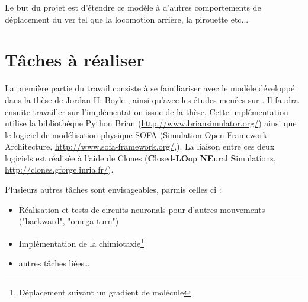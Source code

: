 Le but du projet est d'étendre ce modèle à d'autres comportements de déplacement du ver tel que la locomotion arrière, la pirouette etc...


\section{Tâches à réaliser} %
\label{sec:Tâches à réaliser}

La première partie du travail consiste à se familiariser avec le modèle développé dans la thèse de Jordan
H. Boyle \cite{Boyle2009}, ainsi qu'avec les études menées sur \celeg{}. Il faudra ensuite travailler sur
l'implémentation issue de la thèse. Cette implémentation utilise la bibliothéque Python Brian
(\url{http://www.briansimulator.org/}) ainsi que le logiciel de modélisation physique SOFA
(Simulation Open Framework Architecture, \url{http://www.sofa-framework.org/},\cite{Allard2007}). La liaison entre ces
deux logiciels est réalisée à l'aide de Clones (\textbf{C}losed-\textbf{LO}op \textbf{NE}ural \textbf{S}imulations,\\
\url{http://clones.gforge.inria.fr/}).

Plusieurs autres tâches sont envisageables, parmis celles ci :
\begin{itemize}
   \item Réalisation et tests de circuits neuronals pour d'autres mouvements ("backward", "omega-turn")
   \item Implémentation de la chimiotaxie\footnote{Déplacement suivant un gradient de molécule}
   \item autres tâches liées\dots
\end{itemize}




